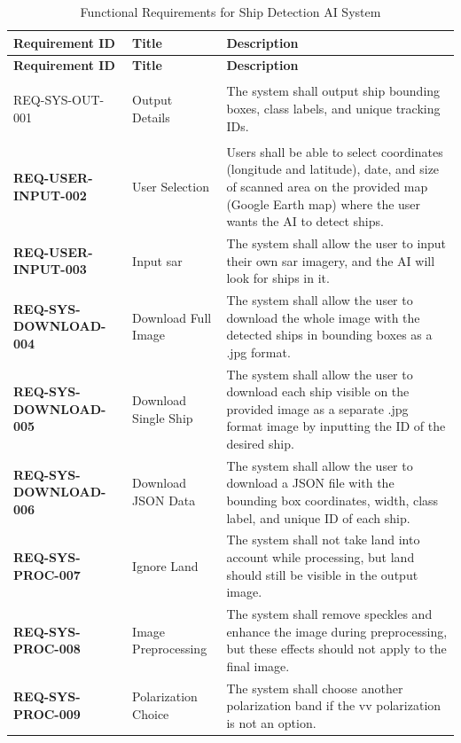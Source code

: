\documentclass{article}
\begin{document}
	\renewcommand{\arraystretch}{1.5} %
	
	\begin{longtable}{>{\bfseries}p{4.5cm}p{3.5cm}p{6.5cm}}
		\caption{Functional Requirements for Ship Detection AI System} \\
		\hline
		\textbf{Requirement ID} & \textbf{Title} & \textbf{Description} \\
		\hline
		\endfirsthead
		
		\hline
		\textbf{Requirement ID} & \textbf{Title} & \textbf{Description} \\
		\hline
		\endhead
		
		\hline
		\endfoot
		
		REQ-SYS-OUT-001 & Output Details & The system shall output ship bounding boxes, class labels, and unique tracking IDs. \\
		REQ-USER-INPUT-002 & User Selection & Users shall be able to select coordinates (longitude and latitude), date, and size of scanned area on the provided map (Google Earth map) where the user wants the AI to detect ships. \\
		REQ-USER-INPUT-003 & Input \acrshort{sar} & The system shall allow the user to input their own \acrshort{sar} imagery, and the AI will look for ships in it. \\
		REQ-SYS-DOWNLOAD-004 & Download Full Image & The system shall allow the user to download the whole image with the detected ships in bounding boxes as a .jpg format. \\
		REQ-SYS-DOWNLOAD-005 & Download Single Ship & The system shall allow the user to download each ship visible on the provided image as a separate .jpg format image by inputting the ID of the desired ship. \\
		REQ-SYS-DOWNLOAD-006 & Download JSON Data & The system shall allow the user to download a JSON file with the bounding box coordinates, width, class label, and unique ID of each ship. \\
		REQ-SYS-PROC-007 & Ignore Land & The system shall not take land into account while processing, but land should still be visible in the output image. \\
		REQ-SYS-PROC-008 & Image Preprocessing & The system shall remove speckles and enhance the image during preprocessing, but these effects should not apply to the final image. \\
		REQ-SYS-PROC-009 & Polarization Choice & The system shall choose another polarization band if the \acrshort{vv} polarization is not an option. \\

\end{longtable}
\end{document}
